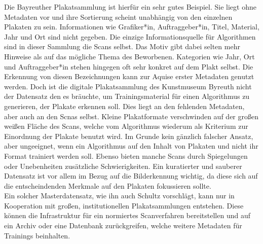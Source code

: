 \documentclass[a4paper,12pt,ngerman]{article}
\begin{document}
Die Bayreuther Plakatsammlung ist hierfür ein sehr gutes Beispiel. Sie liegt ohne Metadaten vor und ihre Sortierung scheint unabhängig von den einzelnen Plakaten zu sein. Informationen wie Grafiker*in, Auftraggeber*in, Titel, Material, Jahr und Ort sind nicht gegeben. Die einzige Informationsquelle für Algorithmen sind in dieser Sammlung die Scans selbst. Das Motiv gibt dabei selten mehr Hinweise als auf das mögliche Thema des Beworbenen. Kategorien wie Jahr, Ort und Auftraggeber*in stehen hingegen oft sehr konkret auf dem Plakt selbst. Die Erkennung von diesen Bezeichnungen kann zur Aquise erster Metadaten genutzt werden. Doch ist die digitale Plakatsammlung des Kunstmuseum Byreuth nicht der Datensatz den es bräuchte, um Trainingsmaterial für einen Algorithmus zu generieren, der Plakate erkennen soll. Dies liegt an den fehlenden Metadaten, aber auch an den Scnas selbst. Kleine Plakatformate verschwinden auf der großen weißen Fläche des Scans, welche vom Algorithmus wiederum als Kriterium zur Einordnung der Plakate benutzt wird. Im Grunde kein gänzlich falscher Ansatz, aber ungeeignet, wenn ein Algorithmus auf den Inhalt von Plakaten und nicht ihr Format trainiert werden soll. Ebenso bieten manche Scans durch Spiegelungen oder Unebenheiten zusätzliche Schwierigkeiten. Ein kuratierter und sauberer Datensatz ist vor allem im Bezug auf die Bilderkennung wichtig, da diese sich auf die entscheindenden Merkmale auf den Plakaten fokussieren sollte. \\
Ein solcher Masterdatensatz, wie ihn auch Schultz vorschlägt, kann nur in Kooperation mit großen, institutionellen Plakatsammlungen entstehen. Diese können die Infrastruktur für ein normiertes Scanverfahren bereitstellen und auf ein Archiv oder eine Datenbank zurückgreifen, welche weitere Metadaten für Trainings beinhalten. \\
\end{document}
